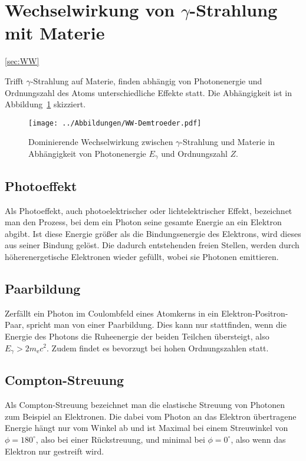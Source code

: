\section{Wechselwirkung von $\gamma$-Strahlung mit Materie}
\ref{sec:WW}

Trifft $\gamma$-Strahlung auf Materie, finden abhängig von Photonenergie und
Ordnungszahl des Atoms unterschiedliche Effekte statt. Die Abhängigkeit ist in
Abbildung~\ref{fig:wechselwirkung} skizziert.
\begin{figure}[htbp]
    \centering
    \texttt{[image: ../Abbildungen/WW-Demtroeder.pdf]}
    \caption{%
        Dominierende Wechselwirkung zwischen $\gamma$-Strahlung und Materie in
        Abhängigkeit von Photonenergie $E_\gamma$ und Ordnungszahl
        $Z$.%
    }
    \label{fig:wechselwirkung}
\end{figure}

\subsection{Photoeffekt}

Als Photoeffekt, auch photoelektrischer oder lichtelektrischer Effekt,
bezeichnet man den Prozess, bei dem ein Photon seine gesamte Energie an ein
Elektron abgibt. Ist diese Energie größer als die Bindungsenergie des
Elektrons, wird dieses aus seiner Bindung gelöst. Die dadurch entstehenden
freien Stellen, werden durch höherenergetische Elektronen wieder gefüllt, wobei
sie Photonen emittieren.

\subsection{Paarbildung}

Zerfällt ein Photon im Coulombfeld eines Atomkerns in ein
Elektron-Positron-Paar, spricht man von einer Paarbildung. Dies kann nur
stattfinden, wenn die Energie des Photons die Ruheenergie der beiden Teilchen
übersteigt, also $E_\gamma > 2m_\mathrm{e}c^2$. Zudem findet es bevorzugt bei
hohen Ordnungszahlen statt.

\subsection{Compton-Streuung}

Als Compton-Streuung bezeichnet man die elastische Streuung von Photonen zum
Beispiel an Elektronen. Die dabei vom Photon an das Elektron übertragene
Energie hängt nur vom Winkel ab und ist Maximal bei einem Streuwinkel von $\phi
= 180^\circ$, also bei einer Rückstreuung, und minimal bei $\phi = 0^\circ$,
also wenn das Elektron nur gestreift wird.

